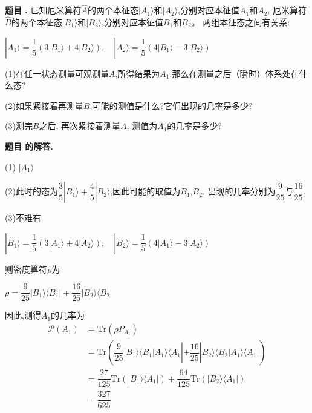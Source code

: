 \documentclass[12pt, a4paper, oneside]{ctexart}
\newcounter{problemname}
\newenvironment{problem}
  {\begin{shaded}\stepcounter{problemname}\par\noindent\textbf{题目 \theproblemname. }}
  {\end{shaded}\par}
\newenvironment{solution}
  {\par\noindent\textbf{题目 \theproblemname 的解答. }}
  {\par}
\begin{document}
\begin{problem}
  已知厄米算符$\hat{A}$的两个本征态$| A_1 \rangle $和$| A_2 \rangle $,分别对应本征值$A_1$和$A_2$,
  厄米算符$\hat{B}$的两个本征态$| B_1 \rangle $和$| B_2 \rangle $,分别对应本征值$B_1$和$B_2$。
  两组本征态之间有关系:

  \centerline{$|A_1\rangle = \dfrac{1}{5}(3|B_1\rangle +4|B_2\rangle),\quad|A_2\rangle = \dfrac{1}{5}(4|B_1\rangle -3|B_2\rangle)$}

  (1)在任一状态测量可观测量$A$,所得结果为$A_1$.那么在测量之后（瞬时）体系处在什么态?

  (2)如果紧接着再测量$B$,可能的测值是什么?它们出现的几率是多少?

  (3)测完$B$之后, 再次紧接着测量$A$, 测值为$A_1$的几率是多少?
\end{problem}

\begin{solution}

  (1) $|A_1\rangle$

  (2)此时的态为$\dfrac{3}{5}|B_1\rangle + \dfrac{4}{5}|B_2\rangle$,因此可能的取值为$B_1$,$B_2$.
  出现的几率分别为$\dfrac{9}{25}$与$\dfrac{16}{25}$.

  (3)不难有

  \centerline{$|B_1\rangle = \dfrac{1}{5}(3|A_1\rangle +4|A_2\rangle),\quad|B_2\rangle = \dfrac{1}{5}(4|A_1\rangle -3|A_2\rangle)$}

  则密度算符$\rho$为

  \centerline{$\rho = \dfrac{9}{25}|B_1\rangle \langle B_1| + \dfrac{16}{25}|B_2\rangle \langle B_2|$}

  因此,测得$A_1$的几率为
  \begin{align*}
    \mathcal{P}(A_1) &= \mathrm{Tr}(\rho P_{A_1})\\
    &= \mathrm{Tr}(\dfrac{9}{25}|B_1\rangle \langle B_1|A_1 \rangle \langle A_1 | + \dfrac{16}{25}|B_2\rangle \langle B_2|A_1 \rangle \langle A_1 |)\\
    &= \dfrac{27}{125}\mathrm{Tr}(|B_1\rangle \langle A_1|) + \dfrac{64}{125}\mathrm{Tr}(|B_2\rangle \langle A_1|) \\
    &= \dfrac{327}{625}
  \end{align*}
\end{solution}
\end{document}
